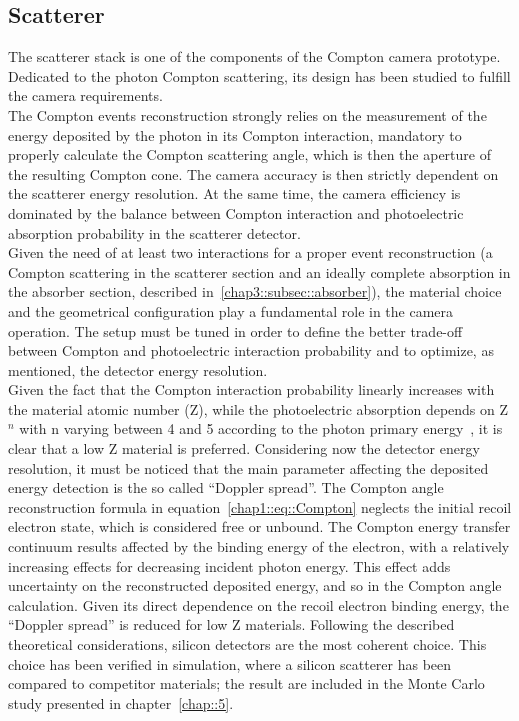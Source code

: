 
\subsection{Scatterer}\label{chap3::subsec::scatterer} 
The scatterer stack is one of the components of the Compton camera prototype. Dedicated to the photon Compton scattering, its design has been studied to fulfill the camera requirements.\\ 
The Compton events reconstruction strongly relies on the measurement of the energy deposited by the photon in its Compton interaction, mandatory to properly calculate the Compton scattering angle, which is then the aperture of the resulting Compton cone. The camera accuracy is then strictly dependent on the scatterer energy resolution. At the same time, the camera efficiency is dominated by the balance between Compton interaction and photoelectric absorption probability in the scatterer detector.\\
Given the need of at least two interactions for a proper event reconstruction (a Compton scattering in the scatterer section and an ideally complete absorption in the absorber section, described in~\ref{chap3::subsec::absorber}), the material choice and the geometrical configuration play a fundamental role in the camera operation. The setup must be tuned in order to define the better trade-off between Compton and photoelectric interaction probability and to optimize, as mentioned, the detector energy resolution.\\
Given the fact that the Compton interaction probability linearly increases with the material atomic number (Z), while the photoelectric absorption depends on Z$^{n}$ with n varying between 4 and 5 according to the photon primary energy~\parencite{Knoll2000}, it is clear that a low Z material is preferred. Considering now the detector energy resolution, it must be noticed that the main parameter affecting the deposited energy detection is the so called \enquote{Doppler spread}. The Compton angle reconstruction formula in equation~\ref{chap1::eq::Compton} neglects the initial recoil electron state, which is considered free or unbound. The Compton energy transfer continuum results affected by the binding energy of the electron, with a relatively increasing effects for decreasing incident photon energy. This effect adds uncertainty on the reconstructed deposited energy, and so in the Compton angle calculation. Given its direct dependence on the recoil electron binding energy, the \enquote{Doppler spread} is reduced for low Z materials. Following the described theoretical considerations, silicon detectors are the most coherent choice. This choice has been verified in simulation, where a silicon scatterer has been compared to competitor materials; the result are included in the Monte Carlo study presented in chapter~\ref{chap::5}.\\
